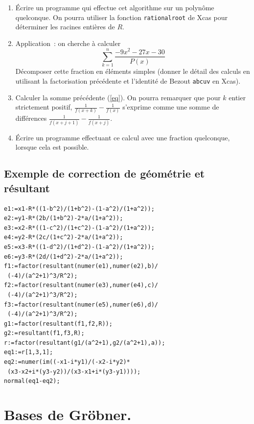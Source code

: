 \documentclass[a4paper,11pt]{article}
\begin{document}
\begin{enumerate}
\[P(x)=x^6+9x^5+29x^4+41x^3+37 x^2+59x+31\]
Montrer que $P$ a la propriété ${\mathcal I}$. Calculer
la ou les racines entières de $R$ et donner la factorisation
correspondante de $P$. 
\item \'Ecrire un programme qui effectue cet algorithme sur un
polyn\^ome quelconque. On pourra utiliser la fonction 
\verb|rationalroot| de Xcas pour d\'eterminer les racines
enti\`eres de $R$.
\item Application~: on cherche \`a calculer
\begin{equation} \label{eq}
 \sum_{k=1}^n \frac{-9x^2-27x-30}{P(x)}
\end{equation}
D\'ecomposer cette fraction
en \'el\'ements simples (donner le d\'etail des calculs en utilisant
la factorisation pr\'ec\'edente et l'identit\'e de Bezout 
\verb|abcuv| en Xcas). 
\item Calculer la somme pr\'ec\'edente (\ref{eq}).
On pourra remarquer que pour $k$ entier strictement positif,
$\frac{1}{f(x+k)}-\frac{1}{f(x)}$
s'exprime comme une somme de diff\'erences  
$\frac{1}{f(x+j+1)}-\frac{1}{f(x+j)}$.
\item \'Ecrire un programme effectuant ce calcul avec une fraction
quelconque, lorsque cela est possible.
\end{enumerate}

\pagebreak

\subsection{Exemple de correction de g\'eom\'etrie et r\'esultant}
\begin{verbatim}
e1:=x1-R*((1-b^2)/(1+b^2)-(1-a^2)/(1+a^2));
e2:=y1-R*(2b/(1+b^2)-2*a/(1+a^2));
e3:=x2-R*((1-c^2)/(1+c^2)-(1-a^2)/(1+a^2));
e4:=y2-R*(2c/(1+c^2)-2*a/(1+a^2));
e5:=x3-R*((1-d^2)/(1+d^2)-(1-a^2)/(1+a^2));
e6:=y3-R*(2d/(1+d^2)-2*a/(1+a^2));
f1:=factor(resultant(numer(e1),numer(e2),b)/
 (-4)/(a^2+1)^3/R^2);
f2:=factor(resultant(numer(e3),numer(e4),c)/
 (-4)/(a^2+1)^3/R^2);
f3:=factor(resultant(numer(e5),numer(e6),d)/
 (-4)/(a^2+1)^3/R^2);
g1:=factor(resultant(f1,f2,R));
g2:=resultant(f1,f3,R);
r:=factor(resultant(g1/(a^2+1),g2/(a^2+1),a));
eq1:=r[1,3,1];
eq2:=numer(im((-x1-i*y1)/(-x2-i*y2)*
 (x3-x2+i*(y3-y2))/(x3-x1+i*(y3-y1))));
normal(eq1-eq2);
\end{verbatim}

\section{Bases de Gr\"obner.} \label{sec:groebner}  
\end{document}
